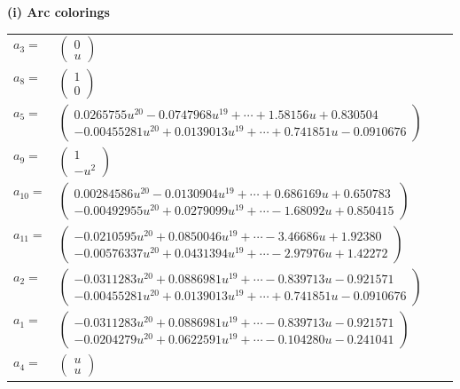 \documentclass[1p]{elsarticle_modified}
\theoremstyle{definition}
\begin{document}
\flushleft \textbf{(i) Arc colorings}\\
\begin{tabular}{m{7pt} m{180pt} m{7pt} m{180pt} }
\flushright $a_{3}=$&$\begin{pmatrix}0\\u\end{pmatrix}$ \\
\flushright $a_{8}=$&$\begin{pmatrix}1\\0\end{pmatrix}$ \\
\flushright $a_{5}=$&$\begin{pmatrix}0.0265755 u^{20}-0.0747968 u^{19}+\cdots+1.58156 u+0.830504\\-0.00455281 u^{20}+0.0139013 u^{19}+\cdots+0.741851 u-0.0910676\end{pmatrix}$ \\
\flushright $a_{9}=$&$\begin{pmatrix}1\\- u^2\end{pmatrix}$ \\
\flushright $a_{10}=$&$\begin{pmatrix}0.00284586 u^{20}-0.0130904 u^{19}+\cdots+0.686169 u+0.650783\\-0.00492955 u^{20}+0.0279099 u^{19}+\cdots-1.68092 u+0.850415\end{pmatrix}$ \\
\flushright $a_{11}=$&$\begin{pmatrix}-0.0210595 u^{20}+0.0850046 u^{19}+\cdots-3.46686 u+1.92380\\-0.00576337 u^{20}+0.0431394 u^{19}+\cdots-2.97976 u+1.42272\end{pmatrix}$ \\
\flushright $a_{2}=$&$\begin{pmatrix}-0.0311283 u^{20}+0.0886981 u^{19}+\cdots-0.839713 u-0.921571\\-0.00455281 u^{20}+0.0139013 u^{19}+\cdots+0.741851 u-0.0910676\end{pmatrix}$ \\
\flushright $a_{1}=$&$\begin{pmatrix}-0.0311283 u^{20}+0.0886981 u^{19}+\cdots-0.839713 u-0.921571\\-0.0204279 u^{20}+0.0622591 u^{19}+\cdots-0.104280 u-0.241041\end{pmatrix}$ \\
\flushright $a_{4}=$&$\begin{pmatrix}u\\u\end{pmatrix}$ \\

\end{tabular}
\end{document}
